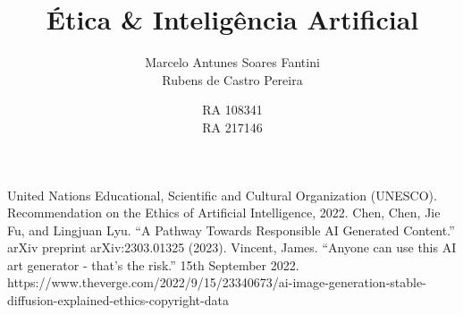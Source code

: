 \documentclass{article}
\title{Ética \& Inteligência Artificial}
\author{Marcelo Antunes Soares Fantini \\ Rubens de Castro Pereira \and RA 108341 \\ RA 217146 }
\begin{document}
\maketitle









% 
% 

\begin{thebibliography}{99}
     United Nations Educational, Scientific and Cultural Organization (UNESCO). Recommendation on the Ethics of Artificial Intelligence, 2022.
     Chen, Chen, Jie Fu, and Lingjuan Lyu. ``A Pathway Towards Responsible AI Generated Content.'' arXiv preprint arXiv:2303.01325 (2023).
     Vincent, James. ``Anyone can use this AI art generator - that's the risk.'' 15th September 2022. https://www.theverge.com/2022/9/15/23340673/ai-image-generation-stable-diffusion-explained-ethics-copyright-data
\end{thebibliography}
\end{document}
